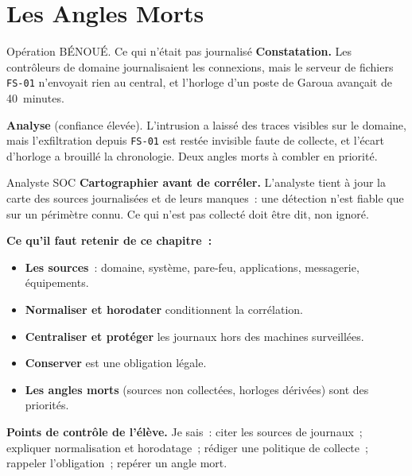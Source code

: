 \section{Les Angles Morts}
\label{sec:c04-angles}

\begin{boxscenario}{Opération BÉNOUÉ. Ce qui n'était pas journalisé}
\textbf{Constatation.} Les contrôleurs de domaine journalisaient les
connexions, mais le serveur de fichiers \texttt{FS-01} n'envoyait rien au
central, et l'horloge d'un poste de Garoua avançait de 40~minutes.

\medskip
\textbf{Analyse} (confiance élevée). L'intrusion a laissé des traces
visibles sur le domaine, mais l'exfiltration depuis \texttt{FS-01} est restée
invisible faute de collecte, et l'écart d'horloge a brouillé la chronologie.
Deux angles morts à combler en priorité.
\end{boxscenario}

\begin{boxmetier}{Analyste SOC}
\textbf{Cartographier avant de corréler.} L'analyste tient à jour la carte
des sources journalisées et de leurs manques~: une détection n'est fiable que
sur un périmètre connu. Ce qui n'est pas collecté doit être dit, non ignoré.
\end{boxmetier}

\separateur

\begin{boxresume}
\textbf{Ce qu'il faut retenir de ce chapitre~:}
\begin{itemize}
    \item \textbf{Les sources}~: domaine, système, pare-feu, applications,
          messagerie, équipements.
    \item \textbf{Normaliser et horodater} conditionnent la corrélation.
    \item \textbf{Centraliser et protéger} les journaux hors des machines
          surveillées.
    \item \textbf{Conserver} est une obligation légale.
    \item \textbf{Les angles morts} (sources non collectées, horloges
          dérivées) sont des priorités.
\end{itemize}
\end{boxresume}

\begin{boxinfo}
\textbf{Points de contrôle de l'élève.} Je sais~: citer les sources de
journaux~; expliquer normalisation et horodatage~; rédiger une politique de
collecte~; rappeler l'obligation~; repérer un angle mort.
\end{boxinfo}

